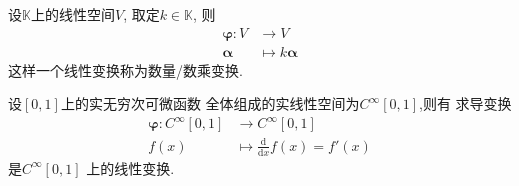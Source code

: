 \begin{brown}
\begin{example}
    设$\mathbb{K}$上的线性空间$V$,
    取定$k \in \mathbb{K}$,
    则\begin{align*}
        \bm{\varphi}:
        V & \longrightarrow V \\
        \bm{\alpha} & \longmapsto
        k\bm{\alpha}
    \end{align*}
    这样一个线性变换称为数量/数乘变换.
\end{example}
\end{brown}
\begin{brown}
\begin{example}
    设$\left[0,1\right]$上的实无穷次可微函数
    全体组成的实线性空间为$\displaystyle
    C^{\infty}\left[0,1\right]$,则有
    求导变换
    \begin{align*}
        \bm{\varphi}:
        C^{\infty}\left[0,1\right] & 
        \longrightarrow
        C^{\infty}\left[0,1\right]\\
        f\left(x\right)
        & \longmapsto
        \frac{\mathrm{d}}{\mathrm{d}x}
        f\left(x\right) = f'\left(x\right)
    \end{align*}
    是$\displaystyle
    C^{\infty}\left[0,1\right]$
    上的线性变换.
\end{example}
\end{brown}
